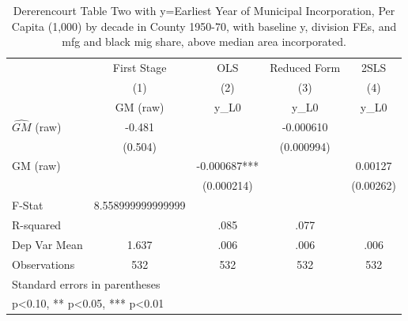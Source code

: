 \begin{table}[htbp]\centering
\def\sym#1{\ifmmode^{#1}\else\(^{#1}\)\fi}
\caption{Dererencourt Table Two with y=Earliest Year of Municipal Incorporation, Per Capita (1,000) by decade in County 1950-70, with baseline y, division FEs, and mfg and black mig share, above median area incorporated.}
\begin{tabular}{l*{4}{c}}
\toprule
                    & First Stage   &         OLS   &Reduced Form   &        2SLS   \\
                    &\multicolumn{1}{c}{(1)}&\multicolumn{1}{c}{(2)}&\multicolumn{1}{c}{(3)}&\multicolumn{1}{c}{(4)}\\
                    &\multicolumn{1}{c}{GM  (raw)}&\multicolumn{1}{c}{y\_L0}&\multicolumn{1}{c}{y\_L0}&\multicolumn{1}{c}{y\_L0}\\
\midrule
$\hat{GM}$ (raw)    &      -0.481   &               &   -0.000610   &               \\
                    &     (0.504)   &               &  (0.000994)   &               \\
\addlinespace
GM  (raw)           &               &   -0.000687***&               &     0.00127   \\
                    &               &  (0.000214)   &               &   (0.00262)   \\
\midrule
F-Stat              &8.558999999999999   &               &               &               \\
R-squared           &               &        .085   &        .077   &               \\
Dep Var Mean        &       1.637   &        .006   &        .006   &        .006   \\
Observations        &         532   &         532   &         532   &         532   \\
\bottomrule
\multicolumn{5}{l}{\footnotesize Standard errors in parentheses}\\
\multicolumn{5}{l}{\footnotesize * p<0.10, ** p<0.05, *** p<0.01}\\
\end{tabular}
\end{table}
